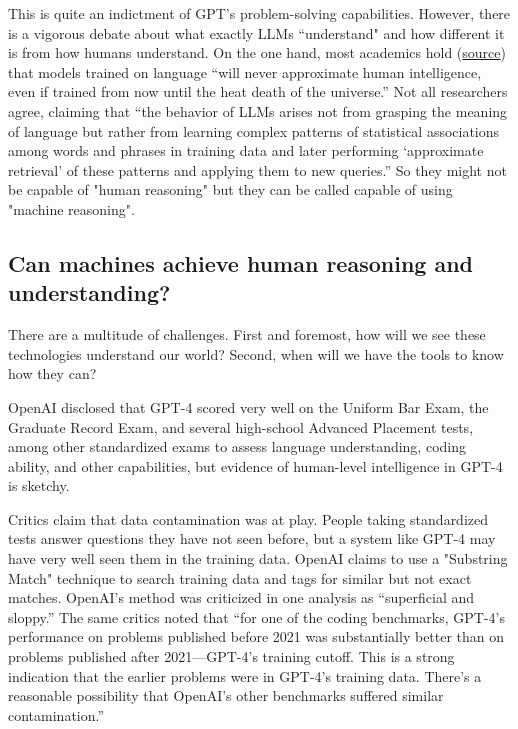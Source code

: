 This is quite an indictment of GPT’s problem-solving capabilities. However, there is a vigorous debate about what exactly LLMs “understand" and how different it is from how humans understand. On the one hand, most academics hold (\href{https://www.science.org/doi/10.1126/science.adj5957}{source}) that models trained on language “will never approximate human intelligence, even if trained from now until the heat death of the universe.” Not all researchers agree, claiming that “the behavior of LLMs arises not from grasping the meaning of language but rather from learning complex patterns of statistical associations among words and phrases in training data and later performing ‘approximate retrieval’ of these patterns and applying them to new queries.” So they might not be capable of "human reasoning" but they can be called capable of using "machine reasoning".

\subsection{Can machines achieve human reasoning and understanding?}

There are a multitude of challenges. First and foremost, how will we see these technologies understand our world? Second, when will we have the tools to know how they can?

OpenAI disclosed that GPT-4 scored very well on the Uniform Bar Exam, the Graduate Record Exam, and several high-school Advanced Placement tests, among other standardized exams to assess language understanding, coding ability, and other capabilities, but evidence of human-level intelligence in GPT-4 is sketchy.

Critics claim that data contamination was at play. People taking standardized tests answer questions they have not seen before, but a system like GPT-4 may have very well seen them in the training data. OpenAI claims to use a "Substring Match" technique to search training data and tags for similar but not exact matches. OpenAI’s method was criticized in one analysis as “superficial and sloppy.” The same critics noted that “for one of the coding benchmarks, GPT-4’s performance on problems published before 2021 was substantially better than on problems published after 2021—GPT-4’s training cutoff. This is a strong indication that the earlier problems were in GPT-4’s training data. There’s a reasonable possibility that OpenAI’s other benchmarks suffered similar contamination.”

